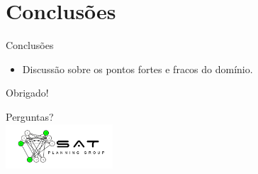 \documentclass[aspectratio=43]{beamer}
\begin{document}
\section{Conclusões}
\begin{frame}{Conclusões}
  \begin{itemize}
    \item Discussão sobre os pontos fortes e fracos do domínio.
  \end{itemize}
\end{frame}

\begin{frame}{Obrigado!}
  \begin{center}
    Perguntas? \\
    \vspace{1cm}
    \includegraphics[width=0.3\textwidth]{sat.jpg}
  \end{center}
\end{frame}
\end{document}
